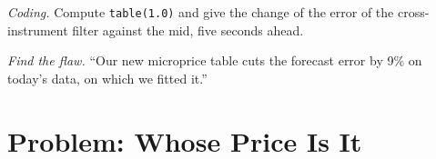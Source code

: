 \begin{exercise}[$\star\star\star$]\label{exo:hf:fair-value:7}
\emph{Coding.} Compute \texttt{table(1.0)} and give the change of the error of the cross-instrument filter against the mid, five seconds ahead.
\end{exercise}

\begin{exercise}[$\star\star\star$]\label{exo:hf:fair-value:8}
\emph{Find the flaw.} ``Our new microprice table cuts the forecast error by 9\% on today's data, on which we fitted it.''
\end{exercise}

\section{Problem: Whose Price Is It}

